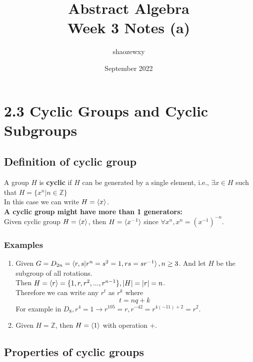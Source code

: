 \documentclass{article}
\title{Abstract Algebra\\
\large{Week 3 Notes (a)}}
\author{shaozewxy }
\date{September 2022}
\begin{document}
\maketitle
\section*{2.3 Cyclic Groups and Cyclic Subgroups}
\subsection*{Definition of cyclic group}
A group $H$ is \textbf{cyclic} if $H$ can be generated by a single element, i.e., $\exists x \in H$ such that $H = \{x^n|n \in \mathbb{Z}\}$\\
In this case we can write $H = \braket{x}$.\\
\textbf{A cyclic group might have more than 1 generators:}\\
Given cyclic group $H = \braket{x}$, then $H = \braket{x^{-1}}$ since $\forall x^n, x^n = (x^{-1})^{-n}$.
\subsubsection*{Examples}
\begin{enumerate}
    \item Given $G = D_{2n} = \braket{r, s|r^n=s^2=1, rs=sr^{-1}}, n \geq 3$. And let $H$ be the subgroup of all rotations.\\
    Then $H = \braket{r} = \{1, r, r^2, ..., r^{n-1}\}, |H| = |r| = n$.\\
    Therefore we can write any $r^t$ as $r^k$ where
    \begin{equation*}
        t = nq + k \tag*{$0 \leq k \leq n$}
    \end{equation*}
    For example in $D_8, r^4 = 1 \rightarrow r^{105} = r, r^{-42} = r^{4(-11)+2} = r^2$.
    \item Given $H = \mathbb{Z}$, then $H = \braket{1}$ with operation $+$.
\end{enumerate}
\subsection*{Properties of cyclic groups}
\end{document}
